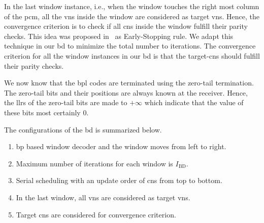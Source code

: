 In the last window instance, i.e., when the window touches the right most column of the \gls{pcm}, all the \glspl{vn} inside the window are considered as target \glspl{vn}. Hence, the convergence criterion is to check if all \glspl{cn} inside the window fulfill their parity checks. This idea was proposed in~\cite{Ali2018} as Early-Stopping rule. We adapt this technique in our \gls{bd} to minimize the total number to iterations. The convergence criterion for all the window instances in our \gls{bd} is that the target-\glspl{cn} should fulfill their parity checks.

We now know that the \gls{bpl} codes are terminated using the zero-tail termination. The zero-tail bits and their positions are always known at the receiver. Hence, the \glspl{llr} of the zero-tail bits are made to $+\infty$ which indicate that the value of these bits most certainly 0.

The configurations of the \gls{bd} is summarized below.
\begin{enumerate}
  \item \gls{bp} based window decoder and the window moves from left to right.
  \item Maximum number of iterations for each window is $I_{\text{BD}}$.
  \item Serial scheduling with an update order of \glspl{cn} from top to bottom.
  \item In the last window, all \glspl{vn} are considered as target \glspl{vn}.
  \item Target \glspl{cn} are considered for convergence criterion.
\end{enumerate}

